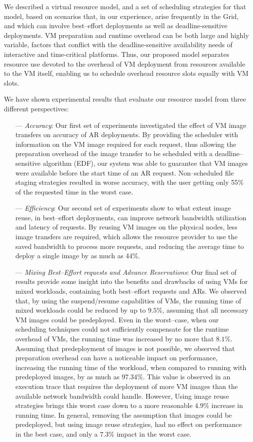 We described a virtual resource model, and a set of scheduling
strategies for that model, based on scenarios that, in our experience,
arise frequently in the Grid, and which can involve best--effort deployments as well as
deadline{}-sensitive deployments. VM preparation and
runtime overhead can be both large and highly variable, factors that
conflict with the deadline{}-sensitive availability needs of
interactive and time{}-critical platforms. Thus, our proposed model
separates resource use devoted to the overhead of VM deployment from
resources available to the VM itself, enabling us to schedule overhead
resource slots equally with VM slots.

We have shown experimental results that evaluate our resource model from three different perspectives:

\begin{itemize}
\item[---] \emph{Accuracy}: Our first set of experiments investigated the effect of VM image transfers on accuracy of AR deployments. By providing the scheduler with information on the VM image required for each request, thus allowing the preparation overhead of the image transfer to be scheduled with a deadline--sensitive algorithm (EDF), our system was able to guarantee that VM images were available before the start time of an AR request. Non--scheduled file staging strategies resulted in worse accuracy, with the user getting only 55\% of the requested time in the worst case.
\item[---] \emph{Efficiency}: Our second set of experiments show to what extent image reuse, in best--effort deployments, can improve network bandwidth utilization and latency of requests. By reusing VM images on the physical nodes, less image transfers are required, which allows the resource provider to use the saved bandwidth to process more requests, and reducing the average time to deploy a single image by as much as 44\%.
\item[---] \emph{Mixing Best--Effort requests and Advance Reservations}: Our final set of results provide some insight into the benefits and drawbacks of using VMs for mixed workloads, containing both best--effort requests and ARs. We observed that, by using the suspend/resume capabilities of VMs, the running time of mixed workloads could be reduced by up to $9.5\%$, assuming that all necessary VM images could be predeployed. Even in the worst--case, when our scheduling techniques could not sufficiently compensate for the runtime overhead of VMs, the running time was increased by no more that $8.1\%$. Assuming that predeployment of images is not possible, we observed that preparation overhead can have a noticeable impact on performance, increasing the running time of the workload, when compared to running with predeployed images, by as much as $97.34\%$. This value is observed in an execution trace that requires the deployment of more VM images than the available network bandwidth could handle. However, Using image reuse strategies brings this worst case down to a more reasonable $4.9\%$ increase in running time. In general, removing the assumption that images could be predeployed, but using image reuse strategies, had no effect on performance in the best case, and only a $7.3\%$ impact in the worst case.

\end{itemize}
